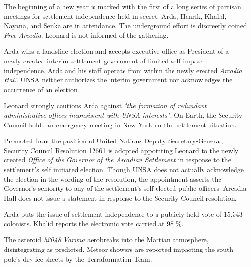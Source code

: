 

The beginning of a new year is marked with the first of a long series of partisan meetings for settlement independence held in secret. Arda, Henrik, Khalid, Nayana, and Senka are in attendance. The underground effort is discreetly coined {\it Free Arcadia}. Leonard is not informed of the gathering.
\StopTimelineDate

Arda wins a landslide election and accepts executive office as President of a newly created interim settlement government of limited self-imposed independence. Arda and his staff operate from within the newly erected {\it Arcadia Hall}. UNSA neither authorizes the interim government nor acknowledges the occurrence of an election.

Leonard strongly cautions Arda against {\it "the formation of redundant administrative offices inconsistent with UNSA interests"}. On Earth, the Security Council holds an emergency meeting in New York on the settlement situation.
\StopTimelineDate

Promoted from the position of United Nations Deputy Secretary-General, Security Council Resolution 12661 is adopted appointing Leonard to the newly created {\it Office of the Governor of the Arcadian Settlement} in response to the settlement's self initiated election. Though UNSA does not actually acknowledge the election in the wording of the resolution, the appointment asserts the Governor's seniority to any of the settlement's self elected public officers. Arcadia Hall does not issue a statement in response to the Security Council resolution.
\StopTimelineDate

Arda puts the issue of settlement independence to a publicly held vote of 15,343 colonists. Khalid reports the electronic vote carried at 98 \%.
\StopTimelineDate

The asteroid {\it 52048 Varuna} aerobreaks into the Martian atmosphere, disintegrating as predicted. Meteor showers are reported impacting the south pole's dry ice sheets by the Terraformation Team.
\StopTimelineDate

